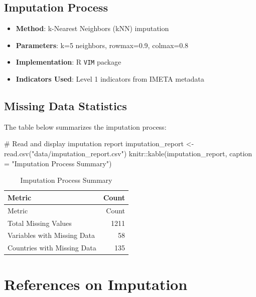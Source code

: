 \documentclass[
  letterpaper,
  DIV=11,
  numbers=noendperiod]{scrartcl}
\newenvironment{Shaded}{\begin{snugshade}}{\end{snugshade}}
\newcommand{\AttributeTok}[1]{\textcolor[rgb]{0.40,0.45,0.13}{#1}}
\newcommand{\CommentTok}[1]{\textcolor[rgb]{0.37,0.37,0.37}{#1}}
\newcommand{\FunctionTok}[1]{\textcolor[rgb]{0.28,0.35,0.67}{#1}}
\newcommand{\NormalTok}[1]{\textcolor[rgb]{0.00,0.23,0.31}{#1}}
\newcommand{\OtherTok}[1]{\textcolor[rgb]{0.00,0.23,0.31}{#1}}
\newcommand{\SpecialCharTok}[1]{\textcolor[rgb]{0.37,0.37,0.37}{#1}}
\newcommand{\StringTok}[1]{\textcolor[rgb]{0.13,0.47,0.30}{#1}}
\providecommand{\tightlist}{%
  \setlength{\itemsep}{0pt}\setlength{\parskip}{0pt}}
\begin{document}
\subsection{Imputation Process}\label{imputation-process}

\begin{itemize}
\tightlist
\item
  \textbf{Method}: k-Nearest Neighbors (kNN) imputation
\item
  \textbf{Parameters}: k=5 neighbors, rowmax=0.9, colmax=0.8
\item
  \textbf{Implementation}: R \texttt{VIM} package
\item
  \textbf{Indicators Used}: Level 1 indicators from IMETA metadata
\end{itemize}

\subsection{Missing Data Statistics}\label{missing-data-statistics}

The table below summarizes the imputation process:

\begin{Shaded}
\begin{Highlighting}[]
\CommentTok{\# Read and display imputation report}
\NormalTok{imputation\_report }\OtherTok{\textless{}{-}} \FunctionTok{read.csv}\NormalTok{(}\StringTok{"data/imputation\_report.csv"}\NormalTok{)}
\NormalTok{knitr}\SpecialCharTok{::}\FunctionTok{kable}\NormalTok{(imputation\_report, }\AttributeTok{caption =} \StringTok{"Imputation Process Summary"}\NormalTok{)}
\end{Highlighting}
\end{Shaded}

\begin{longtable}[]{@{}lr@{}}
\caption{Imputation Process Summary}\tabularnewline
\toprule\noalign{}
Metric & Count \\
\midrule\noalign{}
\endfirsthead
\toprule\noalign{}
Metric & Count \\
\midrule\noalign{}
\endhead
\bottomrule\noalign{}
\endlastfoot
Total Missing Values & 1211 \\
Variables with Missing Data & 58 \\
Countries with Missing Data & 135 \\
\end{longtable}

\section{References on Imputation}\label{references-on-imputation}
\end{document}
